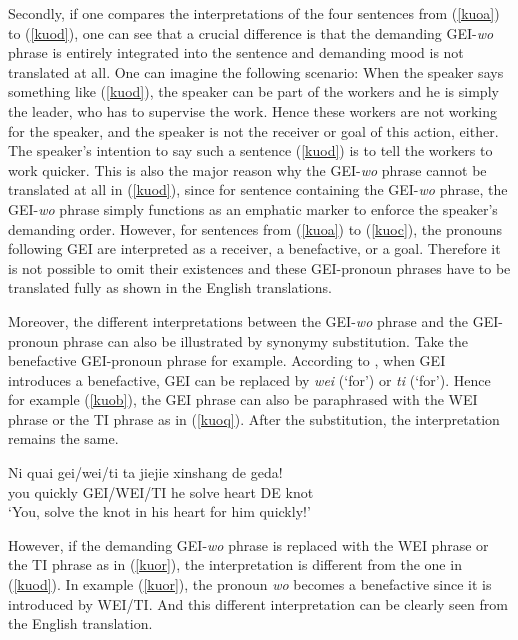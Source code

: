 \documentclass[output=paper,colorlinks,citecolor=brown]{langscibook}
\begin{document}
Secondly, if one compares the interpretations of the four sentences from (\ref{kuoa}) to (\ref{kuod}), one can see that a crucial difference is that the demanding GEI-\textit{wo} phrase is entirely integrated into the sentence and demanding mood is not translated at all. One can imagine the following scenario: When the speaker says something like (\ref{kuod}), the speaker can be part of the workers and he is simply the leader, who has to supervise the work. Hence these workers are not working for the speaker, and the speaker is not the receiver or goal of this action, either. The speaker's intention to say such a sentence (\ref{kuod}) is to tell the workers to work quicker. This is also the major reason why the GEI-\textit{wo} phrase cannot be translated at all in (\ref{kuod}), since for sentence containing the GEI-\textit{wo} phrase, the GEI-\textit{wo} phrase simply functions as an emphatic marker to enforce the speaker's demanding order. However, for sentences from (\ref{kuoa}) to (\ref{kuoc}), the pronouns following GEI are interpreted as a receiver, a benefactive, or a goal. Therefore it is not possible to omit their existences and these GEI-pronoun phrases have to be translated fully as shown in the English translations.
 
Moreover, the different interpretations between the GEI-\textit{wo} phrase and the GEI-pronoun phrase can also be illustrated by synonymy substitution. Take the benefactive GEI-pronoun phrase for example. According to \cite{Liu&Pan&Gu}, when GEI introduces a benefactive, GEI can be replaced by \textit{wei} (`for') or \textit{ti} (`for'). Hence for example (\ref{kuob}), the GEI phrase can also be paraphrased with the WEI phrase or the TI phrase as in (\ref{kuoq}). After the substitution, the interpretation remains the same.

\ea
\label{kuoq}
\gll Ni     quai    gei/wei/ti ta  jiejie  xinshang    de  geda!\\  
     you    quickly GEI/WEI/TI he  solve   heart       DE  knot\\ 
\glt `You, solve the knot in his heart for him quickly!'
\z

However, if the demanding GEI-\textit{wo} phrase is replaced with the WEI phrase or the TI phrase as in (\ref{kuor}), the interpretation is different from the one in (\ref{kuod}). In example (\ref{kuor}), the pronoun \textit{wo} becomes a benefactive since it is introduced by WEI/TI. And this different interpretation can be clearly seen from the English translation.
\end{document}
